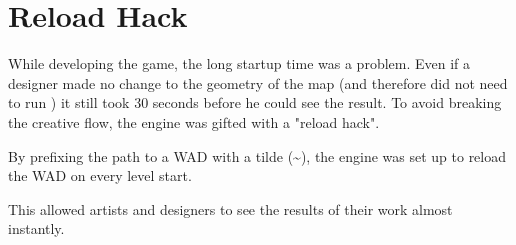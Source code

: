 \section{Reload Hack}
While developing the game, the long startup time was a problem. Even if a designer made no change to the geometry of the map (and therefore did not need to run ) it still took 30 seconds before he could see the result. To avoid breaking the creative flow, the engine was gifted with a "reload hack".\\
\par
By prefixing the path to a WAD with a tilde (\textasciitilde), the engine was set up to reload the WAD on every level start.\\
\par
{}
\par
This allowed artists and designers to see the results of their work almost instantly.
